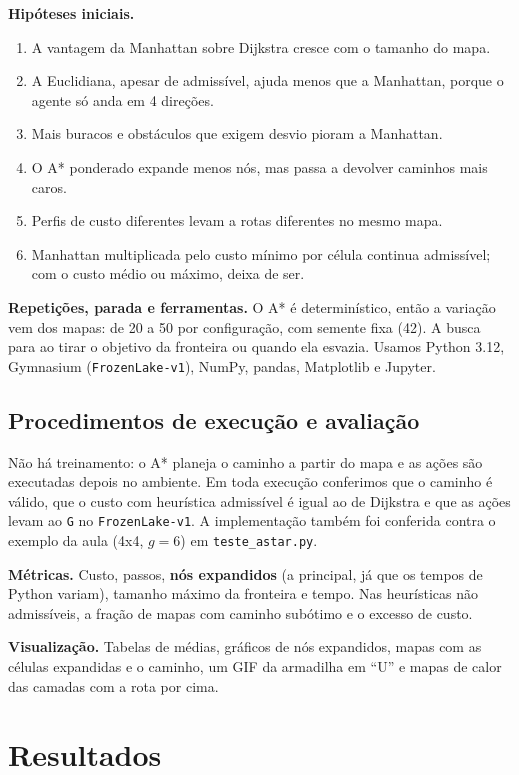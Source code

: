\documentclass[11pt,a4paper]{article}
\begin{document}
\textbf{Hipóteses iniciais.}
\begin{enumerate}[label=H\arabic*.]
  \item A vantagem da Manhattan sobre Dijkstra cresce com o tamanho do mapa.
  \item A Euclidiana, apesar de admissível, ajuda menos que a Manhattan, porque o agente só anda em 4 direções.
  \item Mais buracos e obstáculos que exigem desvio pioram a Manhattan.
  \item O A* ponderado expande menos nós, mas passa a devolver caminhos mais caros.
  \item Perfis de custo diferentes levam a rotas diferentes no mesmo mapa.
  \item Manhattan multiplicada pelo custo mínimo por célula continua admissível; com o custo médio ou máximo, deixa de
    ser.
\end{enumerate}

\textbf{Repetições, parada e ferramentas.} O A* é determinístico, então a variação vem dos mapas: de 20 a 50 por
configuração, com semente fixa (42). A busca para ao tirar o objetivo da fronteira ou quando ela esvazia. Usamos
Python 3.12, Gymnasium (\texttt{FrozenLake-v1}), NumPy, pandas, Matplotlib e Jupyter.

\subsection{Procedimentos de execução e avaliação}

Não há treinamento: o A* planeja o caminho a partir do mapa e as ações são executadas depois no ambiente. Em toda
execução conferimos que o caminho é válido, que o custo com heurística admissível é igual ao de Dijkstra e que as ações
levam ao \texttt{G} no \texttt{FrozenLake-v1}. A implementação também foi conferida contra o exemplo da aula (4x4,
$g = 6$) em \texttt{teste\_astar.py}.

\textbf{Métricas.} Custo, passos, \textbf{nós expandidos} (a principal, já que os tempos de Python variam), tamanho
máximo da fronteira e tempo. Nas heurísticas não admissíveis, a fração de mapas com caminho subótimo e o excesso de
custo.

\textbf{Visualização.} Tabelas de médias, gráficos de nós expandidos, mapas com as células expandidas e o caminho, um
GIF da armadilha em ``U'' e mapas de calor das camadas com a rota por cima.

\section{Resultados}
\end{document}
